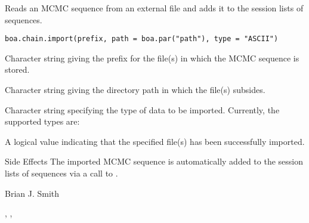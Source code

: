 \begin{Description}\relax
Reads an MCMC sequence from an external file and adds it to the session lists
of sequences.
\end{Description}
\begin{Usage}
\begin{verbatim}
boa.chain.import(prefix, path = boa.par("path"), type = "ASCII")
\end{verbatim}
\end{Usage}
\begin{Arguments}
\begin{ldescription}
\item[\code{prefix}] Character string giving the prefix for the file(s) in which the
MCMC sequence is stored.
\item[\code{path}] Character string giving the directory path in which the file(s)
subsides.
\item[\code{type}] Character string specifying the type of data to be imported.
Currently, the supported types are:
\end{ldescription}
\end{Arguments}
\begin{Value}
A logical value indicating that the specified file(s) has been successfully imported.
\end{Value}
\begin{Section}{Side Effects}
The imported MCMC sequence is automatically added to the session lists of
sequences via a call to .
\end{Section}
\begin{Author}\relax
Brian J. Smith
\end{Author}
\begin{SeeAlso}\relax
{}, ,
\end{SeeAlso}

